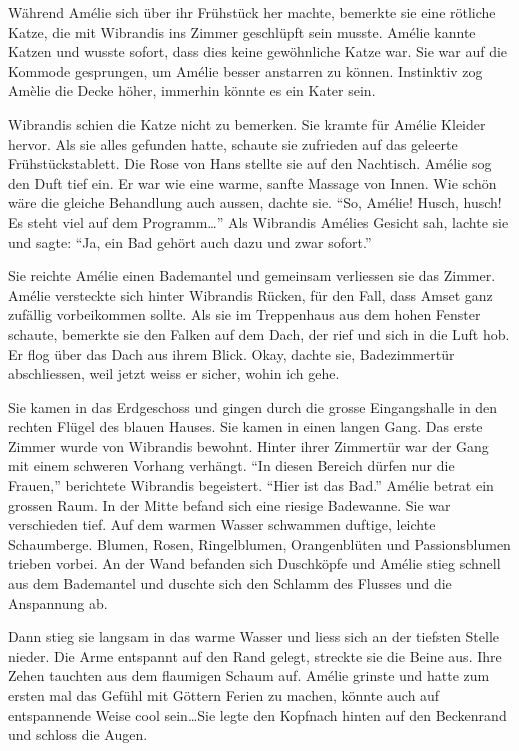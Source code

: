 \documentclass[11pt,titlepage,a5paper]{book}
\begin{document}
Während Amélie sich über ihr Frühstück her machte, bemerkte sie eine rötliche Katze, die mit Wibrandis ins Zimmer geschlüpft sein musste. Amélie kannte Katzen und wusste sofort, dass dies keine gewöhnliche Katze war. Sie war auf die Kommode gesprungen, um Amélie besser anstarren zu können. Instinktiv zog Amèlie die Decke höher, immerhin könnte es ein Kater sein.

Wibrandis schien die Katze nicht zu bemerken. Sie kramte für Amélie Kleider hervor. Als sie alles gefunden hatte, schaute sie zufrieden auf das geleerte Frühstückstablett. Die Rose von Hans stellte sie auf den Nachtisch. Amélie sog den Duft tief ein. Er war wie eine warme, sanfte Massage von Innen. Wie schön wäre die gleiche Behandlung auch aussen, dachte sie. "`So, Amélie! Husch, husch! Es steht viel auf dem Programm\dots"' Als Wibrandis Amélies Gesicht sah, lachte sie und sagte: "`Ja, ein Bad gehört auch dazu und zwar sofort."'

Sie reichte Amélie einen Bademantel und gemeinsam verliessen sie das Zimmer. Amélie versteckte sich hinter Wibrandis Rücken, für den Fall, dass Amset ganz zufällig vorbeikommen sollte. Als sie im Treppenhaus aus dem hohen Fenster schaute, bemerkte sie den Falken auf dem Dach, der rief und sich in die Luft hob. Er flog über das Dach aus ihrem Blick. Okay, dachte sie, Badezimmertür abschliessen, weil jetzt weiss er sicher, wohin ich gehe.

Sie kamen in das Erdgeschoss und gingen durch die grosse Eingangshalle in den rechten Flügel des blauen Hauses. Sie kamen in einen langen Gang. Das erste Zimmer wurde von Wibrandis bewohnt. Hinter ihrer Zimmertür war der Gang mit einem schweren Vorhang verhängt. "`In diesen Bereich dürfen nur die Frauen,"' berichtete Wibrandis begeistert. "`Hier ist das Bad."' Amélie betrat ein grossen Raum. In der Mitte befand sich eine riesige Badewanne. Sie war verschieden tief. Auf dem warmen  Wasser schwammen duftige, leichte Schaumberge. Blumen, Rosen, Ringelblumen, Orangenblüten und Passionsblumen trieben vorbei. An der Wand befanden sich Duschköpfe und Amélie stieg schnell aus dem Bademantel und duschte sich den Schlamm des Flusses und die Anspannung ab. 

Dann stieg sie langsam in das warme Wasser und liess sich an der tiefsten Stelle nieder. Die Arme entspannt auf den Rand gelegt, streckte sie die Beine aus. Ihre Zehen tauchten aus dem flaumigen Schaum auf. Amélie grinste und hatte zum ersten mal das Gefühl mit Göttern Ferien zu machen, könnte auch auf entspannende Weise cool sein\dots Sie legte den Kopfnach hinten auf den Beckenrand und schloss die Augen.
\end{document}
